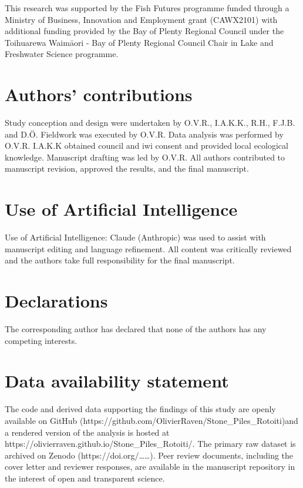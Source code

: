 \documentclass[
  12pt,
  a4paper,
]{scrbook}
\newcounter{none} %
\begin{document}
This research was supported by the Fish Futures programme funded through
a Ministry of Business, Innovation and Employment grant (CAWX2101) with
additional funding provided by the Bay of Plenty Regional Council under
the Toihuarewa Waimāori - Bay of Plenty Regional Council Chair in Lake
and Freshwater Science programme.

\section{Authors' contributions}\label{authors-contributions-3}

Study conception and design were undertaken by O.V.R., I.A.K.K., R.H.,
F.J.B. and D.Ö. Fieldwork was executed by O.V.R. Data analysis was
performed by O.V.R. I.A.K.K obtained council and iwi consent and
provided local ecological knowledge. Manuscript drafting was led by
O.V.R. All authors contributed to manuscript revision, approved the
results, and the final manuscript.

\section{Use of Artificial
Intelligence}\label{use-of-artificial-intelligence}

Use of Artificial Intelligence: Claude (Anthropic) was used to assist
with manuscript editing and language refinement. All content was
critically reviewed and the authors take full responsibility for the
final manuscript.

\section{Declarations}\label{declarations-3}

The corresponding author has declared that none of the authors has any
competing interests.

\section{Data availability
statement}\label{data-availability-statement-3}

The code and derived data supporting the findings of this study are
openly available on GitHub
(https://github.com/OlivierRaven/Stone\_Piles\_Rotoiti)and a rendered
version of the analysis is hosted at
https://olivierraven.github.io/Stone\_Piles\_Rotoiti/. The primary raw
dataset is archived on Zenodo (https://doi.org/\ldots\ldots). Peer
review documents, including the cover letter and reviewer responses, are
available in the manuscript repository in the interest of open and
transparent science.
\end{document}
